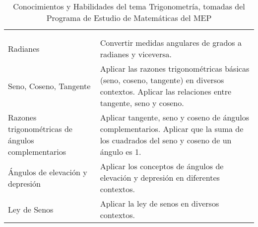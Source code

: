 \begin{table}[htbp]
\centering
\sffamily
\small
{}
\vspace{0.2cm}
 \setlength{\extrarowheight}{.4em}
			\begin{tabularx}{0.99\textwidth}{l*{1}{>{\RaggedRight\arraybackslash}X}}		
\rowcolor{mycolor}\multicolumn{1}{l}{{\color{white}\textbf{Conocimientos}}}&  \multicolumn{1}{l}{{\color{white}\textbf{Habilidades}}}\\
\begin{minipage}[c]{0.4\textwidth}
\textbf{Trigonometría}\\ Radianes 
\end{minipage} & Convertir medidas angulares de grados a radianes y viceversa.\\
\begin{minipage}[c]{0.4\textwidth}
Seno, Coseno, Tangente	
\end{minipage} & Aplicar las razones trigonométricas básicas (seno, coseno, tangente) en diversos contextos. Aplicar las relaciones entre tangente, seno y coseno.\\
\begin{minipage}[c]{0.4\textwidth} 
\vspace{0.05in}
Razones trigonométricas de ángulos complementarios
\vspace{0.05in}
\end{minipage} & Aplicar tangente, seno y coseno de ángulos complementarios. Aplicar que la suma de los cuadrados del seno y coseno de un ángulo es 1.\\
\begin{minipage}[c]{0.4\textwidth}
Ángulos de elevación y depresión
\end{minipage}
 & Aplicar los conceptos de ángulos de elevación y depresión en diferentes contextos.\\
Ley de Senos & Aplicar la ley de senos en diversos contextos.\\
	\end{tabularx}
		\caption[Tema Trigonometría]{Conocimientos y Habilidades del tema Trigonometría, tomadas del Programa de Estudio de Matemáticas del MEP} 
		\label{tab:cyhtrigono}
\vspace{0.2cm}
\end{table}